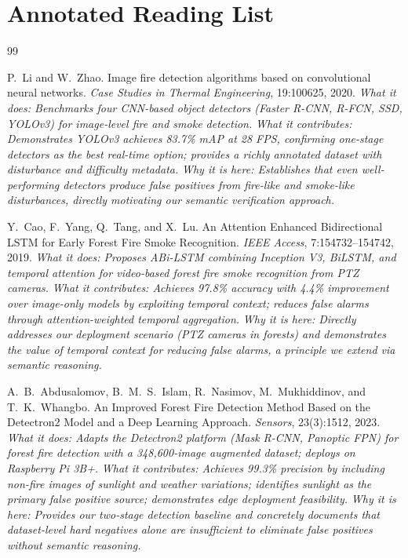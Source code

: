 \documentclass[11pt,twocolumn]{article}
\begin{document}
\section{Annotated Reading List}
\label{sec:readings}

\begin{thebibliography}{99}

P.~Li and W.~Zhao.
\newblock Image fire detection algorithms based on convolutional neural networks.
\newblock \textit{Case Studies in Thermal Engineering}, 19:100625, 2020.
\newblock \textit{What it does: Benchmarks four CNN-based object detectors (Faster R-CNN, R-FCN, SSD, YOLOv3) for image-level fire and smoke detection.}
\newblock \textit{What it contributes: Demonstrates YOLOv3 achieves 83.7\% mAP at 28 FPS, confirming one-stage detectors as the best real-time option; provides a richly annotated dataset with disturbance and difficulty metadata.}
\newblock \textit{Why it is here: Establishes that even well-performing detectors produce false positives from fire-like and smoke-like disturbances, directly motivating our semantic verification approach.}

Y.~Cao, F.~Yang, Q.~Tang, and X.~Lu.
\newblock An Attention Enhanced Bidirectional LSTM for Early Forest Fire Smoke Recognition.
\newblock \textit{IEEE Access}, 7:154732--154742, 2019.
\newblock \textit{What it does: Proposes ABi-LSTM combining Inception V3, BiLSTM, and temporal attention for video-based forest fire smoke recognition from PTZ cameras.}
\newblock \textit{What it contributes: Achieves 97.8\% accuracy with 4.4\% improvement over image-only models by exploiting temporal context; reduces false alarms through attention-weighted temporal aggregation.}
\newblock \textit{Why it is here: Directly addresses our deployment scenario (PTZ cameras in forests) and demonstrates the value of temporal context for reducing false alarms, a principle we extend via semantic reasoning.}

A.~B.~Abdusalomov, B.~M.~S.~Islam, R.~Nasimov, M.~Mukhiddinov, and T.~K.~Whangbo.
\newblock An Improved Forest Fire Detection Method Based on the Detectron2 Model and a Deep Learning Approach.
\newblock \textit{Sensors}, 23(3):1512, 2023.
\newblock \textit{What it does: Adapts the Detectron2 platform (Mask R-CNN, Panoptic FPN) for forest fire detection with a 348,600-image augmented dataset; deploys on Raspberry Pi 3B+.}
\newblock \textit{What it contributes: Achieves 99.3\% precision by including non-fire images of sunlight and weather variations; identifies sunlight as the primary false positive source; demonstrates edge deployment feasibility.}
\newblock \textit{Why it is here: Provides our two-stage detection baseline and concretely documents that dataset-level hard negatives alone are insufficient to eliminate false positives without semantic reasoning.}


\end{thebibliography}
\end{document}
